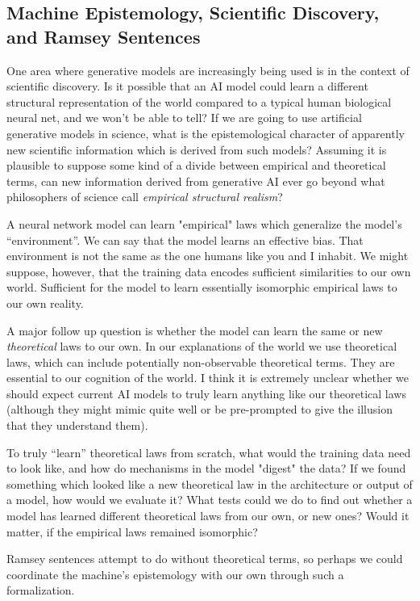 \documentclass[11pt, oneside]{article}   	%
\begin{document}
\subsection{Machine Epistemology, Scientific Discovery, and Ramsey Sentences}

One area where generative models are increasingly being used is in the context of scientific discovery.  Is it possible that an AI model could learn a different structural representation of the world compared to a typical human biological neural net, and we won’t be able to tell?  If we are going to use artificial generative models in science, what is the epistemological character of apparently new scientific information which is derived from such models?  Assuming it is plausible to suppose some kind of a divide between empirical and theoretical terms, can new information derived from generative AI ever go beyond what philosophers of science call \emph{empirical structural realism}?

A neural network model can learn "empirical" laws which generalize the model's ``environment''.  We can say that the model learns an effective bias. That environment is not the same as the one humans like you and I inhabit.   We might suppose, however, that the training data encodes sufficient similarities to our own world.  Sufficient for the model to learn essentially isomorphic empirical laws to our own reality.

A major follow up question is whether the model can learn the same or new \emph{theoretical} laws to our own.  In our explanations of the world we use theoretical laws, which can include potentially non-observable theoretical terms.  They are essential to our cognition of the world.  I think it is extremely unclear whether we should expect current AI models to truly learn anything like our theoretical laws (although they might mimic quite well or be pre-prompted to give the illusion that they understand them).  

To truly ``learn'' theoretical laws from scratch, what would the training data need to look like, and how do mechanisms in the model "digest" the data?  If we found something which looked like a new theoretical law in the architecture or output of a model, how would we evaluate it?  What tests could we do to find out whether a model has learned different theoretical laws from our own, or new ones?  Would it matter, if the empirical laws remained isomorphic?

Ramsey sentences attempt to do without theoretical terms, so perhaps we could coordinate the machine's epistemology with our own through such a formalization.  
\end{document}

